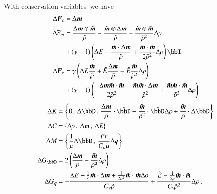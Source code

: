 \documentclass[preprint,12pt]{elsarticle}
\begin{document}
With conservation variables, we have
\begin{align*}
\Delta\bfF_c&=\Delta\bfm\\
\Delta\mathbb{F}_m&=
\frac{\Delta\bfm\otimes\tilde\bfm}{\tilde\rho}
+\frac{\tilde\bfm\otimes\Delta\bfm}{\tilde\rho}
-\frac{\tilde\bfm\otimes\tilde\bfm}{\tilde\rho^2}\Delta\rho\\
&+(\gamma-1)\LRp{\Delta E
-\frac{\tilde\bfm\cdot\Delta\bfm}{\tilde\rho}
+\frac{\tilde\bfm\cdot\tilde\bfm}{2\tilde\rho^2}\Delta\rho
}\bbI\\
\Delta\bfF_e&=
\gamma\LRp{
\Delta E\frac{\tilde\bfm}{\tilde\rho}
+\tilde E\frac{\Delta\bfm}{\tilde\rho}
-\tilde E\frac{\tilde\bfm}{\tilde\rho^2}\Delta\rho}\\
&+(\gamma-1)\LRp{
-\frac{\Delta\bfm\tilde\bfm\cdot\tilde\bfm}{2\tilde\rho^2}
-\frac{\tilde\bfm\tilde\bfm\cdot\Delta\bfm}{\tilde\rho^2}
+\frac{\tilde\bfm\tilde\bfm\cdot\tilde\bfm}{\tilde\rho^3}\Delta\rho
}\\
\end{align*}
\begin{align*}
\Delta K&=\LRc{0\,,\,
\Delta\bbD\,,\,
\frac{\Delta\bfm}{\tilde\rho}\cdot\tilde\bbD
-\frac{\tilde\bfm}{\tilde\rho^2}\cdot\tilde\bbD\Delta\rho
+\frac{\tilde\bfm}{\tilde\rho}\cdot\Delta\bbD}\\
\Delta C&=\LRc{\Delta\rho\,,\,\Delta\bfm\,,\,\Delta E}\\
\Delta M&=\LRc{\frac{1}{\mu}\Delta \bbD\,,\,\frac{Pr}{C_p\mu}\Delta\bfq}\\
\Delta\bfG_{\bbD}&=2\LRp{\frac{\Delta\bfm}{\tilde\rho}-\frac{\tilde\bfm}{\tilde\rho^2}\Delta\rho}\\
\Delta G_{\bfq}&=-\frac{\Delta E-\frac{1}{\tilde\rho}\tilde\bfm\cdot\Delta\bfm
	+\frac{1}{2\tilde\rho^2}\tilde\bfm\cdot\tilde\bfm\Delta\rho}{C_v\tilde\rho}
	+\frac{\tilde E-\frac{1}{2\tilde\rho}\tilde\bfm\cdot\tilde\bfm}{C_v\tilde\rho^2}\Delta\rho\,.
\end{align*}
\end{document}
